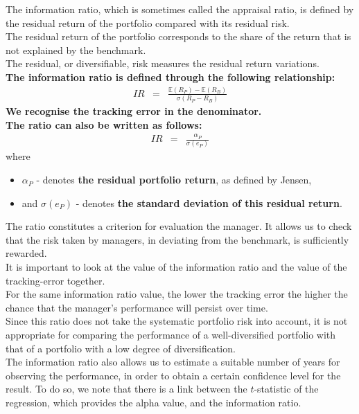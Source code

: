 The information ratio, which is sometimes called the appraisal ratio, is defined by the residual return of the portfolio compared with its residual risk.\\
The residual return of the portfolio corresponds to the share of the return that is not explained by the benchmark.\\
The residual, or diversifiable, risk measures the residual return variations.\\
\textbf{The information ratio is defined through the following relationship:}
\begin{eqnarray}
	IR &=& \frac{\mathbb{E}(R_{P}) - \mathbb{E}(R_{B})}{\sigma(R_{P} - R_{B})}
\end{eqnarray}
\textbf{\color{blue}We recognise the tracking error in the denominator.}\\
\textbf{The ratio can also be written as follows:}
\begin{eqnarray}
	IR &=& \frac{\alpha_{P}}{\sigma(e_{P})}
\end{eqnarray}
where
\begin{itemize}
	\item $\alpha_{P}$ - denotes \textbf{the residual portfolio return}, as defined by Jensen,
	\item and $\sigma(e_{P})$ - denotes \textbf{the standard deviation of this residual return}.
\end{itemize}
The ratio constitutes a criterion for evaluation the manager. It allows us to check that the risk taken by managers, in deviating from the benchmark, is sufficiently rewarded.\\
It is important to look at the value of the information ratio and the value of the tracking-error together.\\
For the same information ratio value, the lower the tracking error the higher the chance that the manager's performance will persist over time.\\
Since this ratio does not take the systematic portfolio risk into account, it is not appropriate for comparing the performance of a well-diversified portfolio with that of a portfolio with a low degree of diversification.\\
The information ratio also allows us to estimate a suitable number of years for observing the performance, in order to obtain a certain confidence level for the result. To do so, we note that there is a link between the $t$-statistic of the regression, which provides the alpha value, and the information ratio.\\
